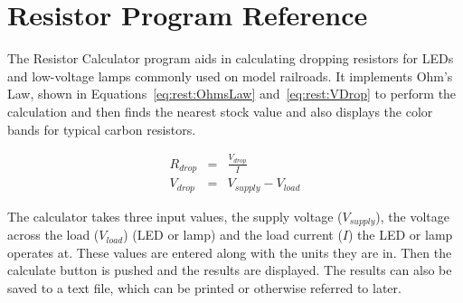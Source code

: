 
\chapter{Resistor Program Reference}
\label{chpt:rest:Reference}

The Resistor Calculator program aids in calculating dropping resistors
for LEDs and low-voltage lamps commonly used on model railroads.  It
implements Ohm's Law, shown in
Equations~\ref{eq:rest:OhmsLaw} and~\ref{eq:rest:VDrop} to perform the
calculation and then finds the nearest stock value and also displays
the color bands for typical carbon resistors.

\begin{eqnarray}
R_{drop} &=& \frac{V_{drop}}{I} \label{eq:rest:OhmsLaw} \\
V_{drop} &=& V_{supply} - V_{load} \label{eq:rest:VDrop}
\end{eqnarray}

The calculator takes three input values, the supply voltage
($V_{supply}$), the voltage across the load ($V_{load}$) (LED or lamp)
and the load current ($I$) the LED or lamp operates at.  These values
are entered along with the units they are in. Then the calculate button
is pushed and the results are displayed.  The results can also be saved
to a text file, which can be printed or otherwise referred to later.

